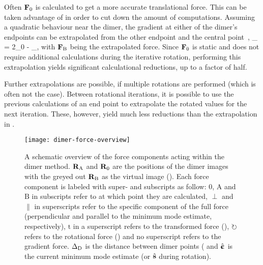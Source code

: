 Often ${\mathrm{\mathbf{\bm{F}}}}_0$ is calculated to get a more accurate translational force.
This can be taken advantage of in order to cut down the amount of computations.
Assuming a quadratic behaviour near the dimer, the gradient at either of the dimer's endpoints can be extrapolated from the other endpoint and the central point~\cite{dimer-olsen-2004},
\vF_ = 2\vF_0 - \vF_,
\eeq
with ${\mathrm{\mathbf{\bm{F}}}}_\text{B}$ being the extrapolated force.
Since ${\mathrm{\mathbf{\bm{F}}}}_0$ is static and does not require additional calculations during the iterative rotation, performing this extrapolation yields significant calculational reductions, up to a factor of half.

Further extrapolations are possible, if multiple rotations are performed (which is often not the case).
Between rotational iterations, it is possible to use the previous calculations of an end point to extrapolate the rotated values for the next iteration.\cite{dimer-kastner-2008}
These, however, yield much less reductions than the extrapolation in .

\begin{figure}[h]
  \begin{center}
    \texttt{[image: dimer-force-overview]}
\parbox{0.85\linewidth}{\caption{A schematic overview of the force components acting within the dimer method.
${\mathrm{\mathbf{\bm{R}}}}_\text{A}$ and ${\mathrm{\mathbf{\bm{R}}}}_0$ are the positions of the dimer images with the greyed out ${\mathrm{\mathbf{\bm{R}}}}_\text{B}$ as the virtual image ().
Each force component is labeled with super- and subscripts as follow:
$0$, $\text{A}$ and $\text{B}$ in subscripts refer to at which point they are calculated,
$\perp$ and $\parallel$ in superscripts refer to the specific component of the full force (perpendicular and parallel to the minimum mode estimate, respectively),
$\text{t}$ in a superscript refers to the transformed force (),
$\circlearrowright$ refers to the rotational force () and no superscript refers to the gradient force.
$\Delta_\text{D}$ is the distance between dimer points ( and $\hat{{\mathrm{\mathbf{\bm{\upepsilon}}}}}$ is the current minimum mode estimate (or $\hat{{\mathrm{\mathbf{\bm{s}}}}}$ during rotation).
}
\label{fig:dimer-force-overview}
}
  \end{center}
\end{figure}

